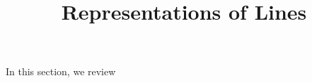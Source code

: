 \documentclass{ximera}
\title{Representations of Lines}
\begin{document}
  
\begin{abstract}  
\end{abstract}  
\maketitle 

In this section, we review 
\end{document}
